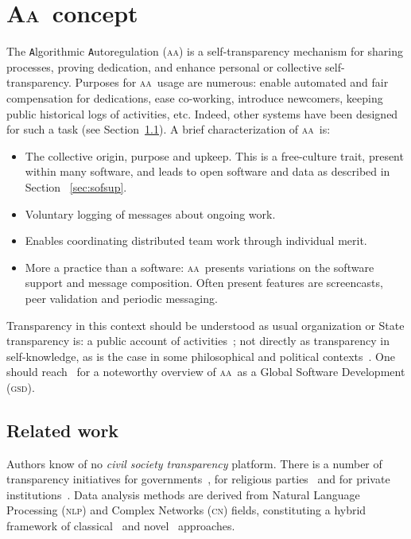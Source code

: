 \documentclass[a4paper, 11pt]{article} %
\newcommand{\nlp}{\textsc{nlp}}
\newcommand{\cn}{\textsc{cn}}
\newcommand{\aab}{\textsc{aa}}
\newcommand{\aai}{\textsc{Aa}}
\newcommand{\gsd}{\textsc{gsd}}
\begin{document}
\section{\aai\ concept}\label{sec:start}
The {\tt A}lgorithmic {\tt A}utoregulation (\aab) is a self-transparency mechanism for sharing processes, proving dedication, and enhance personal or collective self-transparency. Purposes for \aab\ usage are numerous: enable automated and fair compensation for dedications, ease co-working, introduce newcomers, keeping public historical logs of activities, etc. Indeed, other systems have been designed for such a task (see Section~\ref{sec:rel}). A brief characterization of \aab\ is:
\begin{itemize}
    \item The collective origin, purpose and upkeep. This is a free-culture trait, present within many software, and leads to open software and data as described in Section ~\ref{sec:sofsup}.
    \item Voluntary logging of messages about ongoing work.
    \item Enables coordinating distributed team work through individual merit.
    \item More a practice than a software: \aab\ presents variations on the software support and message composition. Often present features are screencasts, peer validation and periodic messaging.
\end{itemize}

Transparency in this context should be understood as usual organization or State transparency is: a public account of activities~\cite{stso}; not directly as transparency in self-knowledge, as is the case in some philosophical and political contexts~\cite{stph}. One should reach~\cite{paaper} for a noteworthy overview of \aab\ as a Global Software Development (\gsd).

 \subsection{Related work}\label{sec:rel}
 Authors know of no \emph{civil society transparency} platform. There is a number of transparency initiatives for governments~\cite{govTr}, for religious parties~\cite{espTr} and for private institutions~\cite{priTr}. Data analysis methods are derived from Natural Language Processing (\nlp) and Complex Networks (\cn) fields, constituting a hybrid framework of classical~\cite{cla1,cla2} and novel~\cite{nov1,nov2} approaches.
\end{document}
